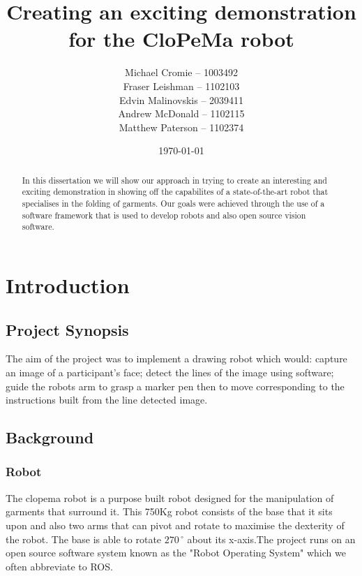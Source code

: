 \documentclass{l3proj}
\begin{document}
\title{Creating an exciting demonstration for the CloPeMa robot}
\author{Michael Cromie -- 1003492 \\
		Fraser Leishman -- 1102103 \\
        Edvin Malinovskis -- 2039411 \\
        Andrew McDonald -- 1102115  \\
        Matthew Paterson -- 1102374 \\
        }
\date{\today}
\maketitle
\begin{abstract}
In this dissertation we will show our approach in trying to create an interesting and exciting demonstration in showing off the capabilites of a state-of-the-art robot that specialises in the folding of garments. Our goals were achieved through the use of a software framework that is used to develop robots and also open source vision software.
\end{abstract}
\educationalconsent
\tableofcontents
\chapter{Introduction}
\label{intro}
\section{Project Synopsis}
The aim of the project was to implement a drawing robot which would: capture an image of a participant's face; detect the lines of the image using software; guide the robots arm to grasp a marker pen then to move corresponding to the instructions built from the line detected image. 

\section{Background}
\subsection{Robot}
The \acrshort{clopema} robot is a purpose built robot designed for the manipulation of garments that surround it. This 750Kg robot consists of the base that it sits upon and also two arms that can pivot and rotate to maximise the dexterity of the robot. The base is able to rotate \begin{math} 270\,^{\circ}
\end{math} about its x-axis.The project runs on an open source software system known as the "Robot Operating System" which we often abbreviate to ROS.
\end{document}
